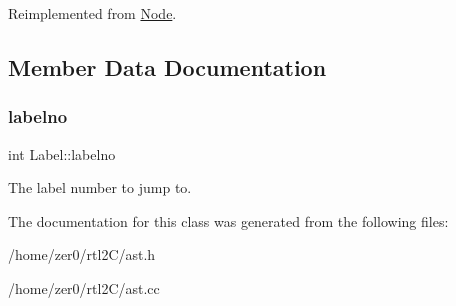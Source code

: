 Reimplemented from \hyperlink{class_node_a3e67ec8d22182b721717af14fe0c3000}{Node}.



\subsection{Member Data Documentation}
\mbox{\label{class_label_a55c90cfdce54343d134203fb4922913b}} 
\subsubsection{\texorpdfstring{labelno}{labelno}}
{\footnotesize\ttfamily int Label\+::labelno\hspace{0.3cm}{\ttfamily [protected]}}

The label number to jump to. 

The documentation for this class was generated from the following files\+:\begin{DoxyCompactItemize}
\item 
/home/zer0/rtl2\+C/ast.\+h\item 
/home/zer0/rtl2\+C/ast.\+cc\end{DoxyCompactItemize}
